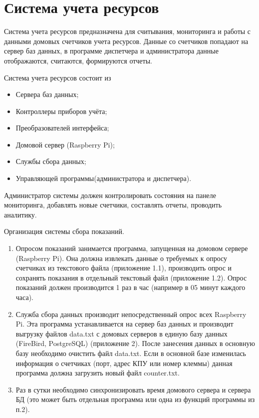 
\section{Система учета ресурсов}
Система учета ресурсов предназначена для считывания, мониторинга и работы с   данными домовых счетчиков учета ресурсов. Данные со счетчиков попадают на сервер баз данных, в программе диспетчера и администратора данные отображаются, считаются, формируются отчеты. \cite{NK}

Система учета ресурсов состоит из

\begin{itemize}
	\item Сервера баз данных;
	\item Контроллеры приборов учёта;
	\item Преобразователей интерфейса;
	\item Домовой сервер (Raspberry Pi);
	\item Службы сбора данных;
	\item Управляющей программы(администратора и диспетчера).
\end{itemize}
Администратор системы должен контролировать состояния на панеле мониторинга, добавлять новые счетчики, составлять отчеты, проводить аналитику. 

Организация системы сбора показаний.

\begin{enumerate}
	\item Опросом показаний занимается программа, запущенная на домовом сервере (Raspberry Pi).  Она должна извлекать данные о требуемых к опросу счетчиках из текстового файла (приложение 1.1), производить опрос и сохранять показания в отдельный текстовый файл (приложение 1.2). Опрос показаний должен производится 1 раз  в час (например в 05 минут каждого часа).
	\item Служба сбора данных производит непосредственный опрос всех Raspberry Pi. Эта программа устанавливается на сервер баз данных и производит выгрузку файлов data.txt  с домовых серверов в единую базу данных (FireBird, PostgreSQL) (приложение 2). После занесения данных в основную базу необходимо очистить файл data.txt.  Если в основной базе изменилась информация о счетчиках (порт, адрес КПУ или номер клеммы) данная программа должна загрузить новый файл counter.txt.
	\item Раз в сутки необходимо синхронизировать время домового сервера и сервера БД (это может быть отдельная программа или одна из функций программы из п.2).	
\end{enumerate}

